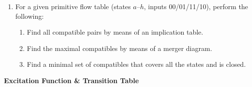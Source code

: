 \documentclass[12pt,a3paper]{article}
\newcommand{\yr}[1]{\hfill\textcolor{gray}{\small\textbf{[#1]}}}
\newcommand{\mk}[1]{\textcolor{orange!70!black}{\small\textbf{(#1 marks)}}}
\newcommand{\subtopic}[2]{%
  \vspace{10pt}
  \noindent\begin{tcolorbox}[colback=#1!8,colframe=#1,boxrule=0.6pt,arc=4pt,
    left=6pt,right=6pt,top=4pt,bottom=4pt]
    \small\bfseries\textcolor{#1}{#2}
  \end{tcolorbox}
  \vspace{2pt}
}
\begin{document}
\begin{enumerate}
\textit{``Binary information present at the D input is transferred to the Q output when G is equal to 1. The Q output will follow the D input as long as G = 1. When G goes to 0, the information that was present at the D input at the time the transition occurred is retained at the Q output.''}

Derive the primitive flow table and then obtain the reduced flow table.
\mk{6+6} \yr{CSE 205 | L-2/T-1 | 2011--12}


\item For a given primitive flow table (states $a$--$h$, inputs 00/01/11/10), perform the following:
\begin{enumerate}
  \item Find all compatible pairs by means of an implication table.
  \item Find the maximal compatibles by means of a merger diagram.
  \item Find a minimal set of compatibles that covers all the states and is closed.
\end{enumerate}

\end{enumerate}


\subtopic{cF}{Excitation Function \& Transition Table}

\label{sub:s6-excitation}
\end{document}
